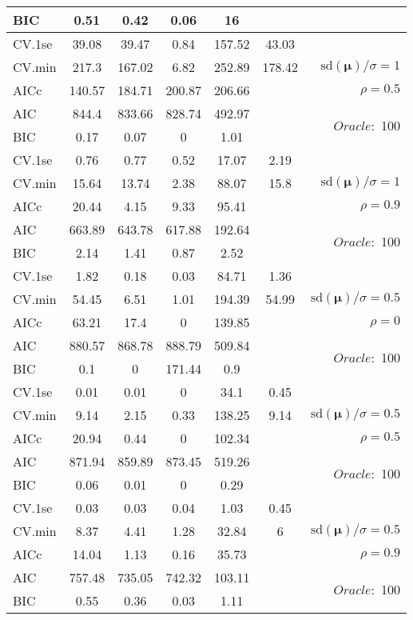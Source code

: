 \begin{table}
\begin{center}
\begin{tabular}{l*{5}{c}|r}
BIC & 0.51 & 0.42 & 0.06 & 16 & &  \\
 \hline 
CV.1se & 39.08 & 39.47 & 0.84 & 157.52 & 43.03 & \\
CV.min & 217.3 & 167.02 & 6.82 & 252.89 & 178.42 &  $\mathrm{sd}(\mathbf{\mu})/\sigma=1$ \\
AICc & 140.57 & 184.71 & 200.87 & 206.66 & & $\rho=0.5$ \\
AIC & 844.4 & 833.66 & 828.74 & 492.97 & &  \multirow{2}{*}{$Oracle: $ 100} \\
BIC & 0.17 & 0.07 & 0 & 1.01 & &  \\
 \hline 
CV.1se & 0.76 & 0.77 & 0.52 & 17.07 & 2.19 & \\
CV.min & 15.64 & 13.74 & 2.38 & 88.07 & 15.8 &  $\mathrm{sd}(\mathbf{\mu})/\sigma=1$ \\
AICc & 20.44 & 4.15 & 9.33 & 95.41 & & $\rho=0.9$ \\
AIC & 663.89 & 643.78 & 617.88 & 192.64 & &  \multirow{2}{*}{$Oracle: $ 100} \\
BIC & 2.14 & 1.41 & 0.87 & 2.52 & &  \\
 \hline 
CV.1se & 1.82 & 0.18 & 0.03 & 84.71 & 1.36 & \\
CV.min & 54.45 & 6.51 & 1.01 & 194.39 & 54.99 &  $\mathrm{sd}(\mathbf{\mu})/\sigma=0.5$ \\
AICc & 63.21 & 17.4 & 0 & 139.85 & & $\rho=0$ \\
AIC & 880.57 & 868.78 & 888.79 & 509.84 & &  \multirow{2}{*}{$Oracle: $ 100} \\
BIC & 0.1 & 0 & 171.44 & 0.9 & &  \\
 \hline 
CV.1se & 0.01 & 0.01 & 0 & 34.1 & 0.45 & \\
CV.min & 9.14 & 2.15 & 0.33 & 138.25 & 9.14 &  $\mathrm{sd}(\mathbf{\mu})/\sigma=0.5$ \\
AICc & 20.94 & 0.44 & 0 & 102.34 & & $\rho=0.5$ \\
AIC & 871.94 & 859.89 & 873.45 & 519.26 & &  \multirow{2}{*}{$Oracle: $ 100} \\
BIC & 0.06 & 0.01 & 0 & 0.29 & &  \\
 \hline 
CV.1se & 0.03 & 0.03 & 0.04 & 1.03 & 0.45 & \\
CV.min & 8.37 & 4.41 & 1.28 & 32.84 & 6 &  $\mathrm{sd}(\mathbf{\mu})/\sigma=0.5$ \\
AICc & 14.04 & 1.13 & 0.16 & 35.73 & & $\rho=0.9$ \\
AIC & 757.48 & 735.05 & 742.32 & 103.11 & &  \multirow{2}{*}{$Oracle: $ 100} \\
BIC & 0.55 & 0.36 & 0.03 & 1.11 & &  \\
 \hline 
\end{tabular}
\end{center}
\vspace{-1cm}
\end{table}



